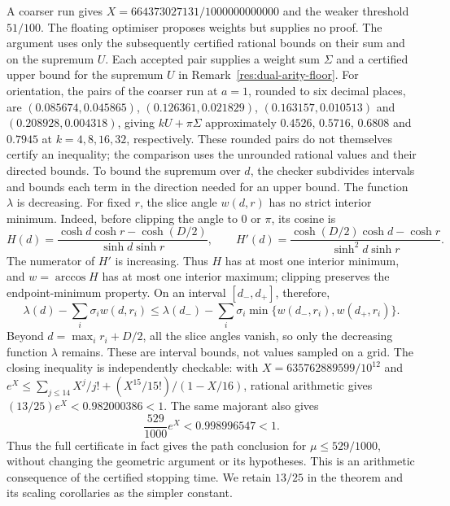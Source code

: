 \documentclass[11pt]{article}
\begin{document}
A coarser run gives $X=664373027131/1000000000000$
and the weaker threshold $51/100$.
The floating optimiser proposes weights but supplies no proof. The
argument uses only the subsequently certified rational bounds on their
sum and on the supremum $U$.  Each accepted
pair supplies a weight sum $\Sigma$ and a certified upper bound for the
supremum $U$ in Remark~\ref{res:dual-arity-floor}. For orientation, the
pairs of the coarser run at $a=1$, rounded to six decimal places, are
$(0.085674,0.045865)$, $(0.126361,0.021829)$, $(0.163157,0.010513)$ and
$(0.208928,0.004318)$, giving $kU+\pi\Sigma$ approximately
$0.4526$, $0.5716$, $0.6808$ and $0.7945$ at $k=4,8,16,32$, respectively.
These rounded pairs do not themselves certify an inequality; the comparison
uses the unrounded rational values and their directed bounds.
To bound the supremum over $d$, the checker subdivides intervals and bounds
each term in the direction needed for an upper bound. The function
$\lambda$ is decreasing. For fixed $r$, the slice angle $w(d,r)$ has no
strict interior minimum. Indeed, before clipping the angle to $0$ or $\pi$,
its cosine is
\[
 H(d)=\frac{\cosh d\cosh r-\cosh(D/2)}{\sinh d\sinh r},\qquad
 H'(d)=\frac{\cosh(D/2)\cosh d-\cosh r}{\sinh^2d\sinh r}.
\]
The numerator of $H'$ is increasing. Thus $H$ has at most one interior
minimum, and $w=\arccos H$ has at most one interior maximum; clipping
preserves the endpoint-minimum property. On an interval $[d_-,d_+]$,
therefore,
\[
 \lambda(d)-\sum_i\sigma_iw(d,r_i)
 \le\lambda(d_-)-\sum_i\sigma_i
       \min\{w(d_-,r_i),w(d_+,r_i)\}.
\]
Beyond $d=\max_i r_i+D/2$, all the slice angles vanish, so only the
decreasing function $\lambda$ remains. These are interval bounds, not
values sampled on a grid.
The closing inequality is independently checkable: with
$X=635762889599/10^{12}$ and
$e^X\le\sum_{j\le14}X^j/j!+(X^{15}/15!)/(1-X/16)$, rational arithmetic gives
$(13/25)e^X<0.982000386<1$. The same majorant also gives
\[
 \frac{529}{1000}e^X<0.998996547<1.
\]
Thus the full certificate in fact gives the path conclusion for
$\mu\le529/1000$, without changing the geometric argument or its hypotheses.
This is an arithmetic consequence of the certified stopping time. We retain $13/25$ in the theorem and its scaling
corollaries as the simpler constant.
\end{document}
